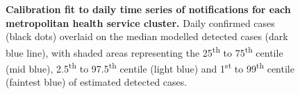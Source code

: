 
\begin{figure}[ht]
    \caption{\textbf{Calibration fit to daily time series of notifications for each metropolitan health service cluster.} Daily confirmed cases (black dots) overlaid on the median modelled detected cases (dark blue line), with shaded areas representing the 25\textsuperscript{th} to 75\textsuperscript{th} centile (mid blue), 2.5\textsuperscript{th} to 97.5\textsuperscript{th} centile (light blue) and 1\textsuperscript{st} to 99\textsuperscript{th} centile (faintest blue) of estimated detected cases.}
\end{figure}

